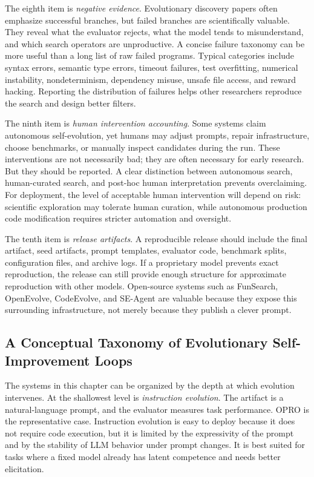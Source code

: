 The eighth item is \emph{negative evidence}.  Evolutionary discovery papers often emphasize successful branches, but failed branches are scientifically valuable.  They reveal what the evaluator rejects, what the model tends to misunderstand, and which search operators are unproductive.  A concise failure taxonomy can be more useful than a long list of raw failed programs.  Typical categories include syntax errors, semantic type errors, timeout failures, test overfitting, numerical instability, nondeterminism, dependency misuse, unsafe file access, and reward hacking.  Reporting the distribution of failures helps other researchers reproduce the search and design better filters.

The ninth item is \emph{human intervention accounting}.  Some systems claim autonomous self-evolution, yet humans may adjust prompts, repair infrastructure, choose benchmarks, or manually inspect candidates during the run.  These interventions are not necessarily bad; they are often necessary for early research.  But they should be reported.  A clear distinction between autonomous search, human-curated search, and post-hoc human interpretation prevents overclaiming.  For deployment, the level of acceptable human intervention will depend on risk: scientific exploration may tolerate human curation, while autonomous production code modification requires stricter automation and oversight.

The tenth item is \emph{release artifacts}.  A reproducible release should include the final artifact, seed artifacts, prompt templates, evaluator code, benchmark splits, configuration files, and archive logs.  If a proprietary model prevents exact reproduction, the release can still provide enough structure for approximate reproduction with other models.  Open-source systems such as FunSearch, OpenEvolve, CodeEvolve, and SE-Agent are valuable because they expose this surrounding infrastructure, not merely because they publish a clever prompt.

\subsection{A Conceptual Taxonomy of Evolutionary Self-Improvement Loops}
\label{subsec:evolution-taxonomy-loops}

The systems in this chapter can be organized by the depth at which evolution intervenes.  At the shallowest level is \emph{instruction evolution}.  The artifact is a natural-language prompt, and the evaluator measures task performance.  OPRO is the representative case.  Instruction evolution is easy to deploy because it does not require code execution, but it is limited by the expressivity of the prompt and by the stability of LLM behavior under prompt changes.  It is best suited for tasks where a fixed model already has latent competence and needs better elicitation.

